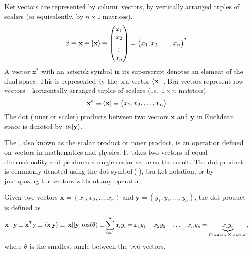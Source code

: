 \begin{defn}{1}
	Ket vectors are represented by column vectors, by vertically arranged tuples of scalers (or equivalently, by $n \times 1$ matrices).
	\begin{align}
		\vec{x} \equiv \mathbf{x} \equiv \ket{\mathbf{x}} \equiv \left(\begin{matrix}
			x_1 \\ x_2 \\ \vdots \\ x_n
		\end{matrix}\right) = \left(\begin{matrix}
		x_1, x_2, \hdots, x_n
	\end{matrix}\right)^T
	\end{align}
	A vector $\mathbf{x}^*$ with an asterisk symbol in its superscript denotes an element of the dual space. This is represented by the bra vector $\bra{\mathbf{x}}$ . Bra vectors represent row vectors - horizontally arranged tuples of scalars (i.e. $1 \times n$ matrices).
		\begin{align}
		\mathbf{x}^* \equiv \bra{\mathbf{x}} \equiv \left(\begin{matrix}
			x_1, x_2, \hdots, x_n
		\end{matrix}\right)
	\end{align}
	The dot (inner or scaler) products between two vectors $\mathbf{x}$ and $\mathbf{y}$ in Euclidean space is denoted by $\braket{\mathbf{x}|\mathbf{y}}$.
\end{defn}

The , also known as the scalar product or inner product, is an operation defined on vectors in mathematics and physics. It takes two vectors of equal dimensionality and produces a single scalar value as the result. The dot product is commonly denoted using the dot symbol ($\cdot$), bra-ket notation, or by juxtaposing the vectors without any operator.

\begin{defn}{1}
	Given two vectors $\mathbf{x}=(x_1, x_2, \hdots, x_n)$ and $\mathbf{y}=(y_1, y_2, \hdots, y_n)$, the dot product is defined as
	\begin{align}
		\mathbf{x}\cdot\mathbf{y} \equiv \mathbf{x}^T\mathbf{y} \equiv \braket{\mathbf{x}|\mathbf{y}} \equiv |\mathbf{x}||\mathbf{y}|\cos(\theta) \equiv \sum_{i=1}^{n} x_iy_i = x_1y_1 + x_2y_2 + \hdots + x_ny_n = \underbrace{x_iy_i}_{\text{Einstein Notation}},
	\end{align}
	where $\theta$ is the smallest angle between the two vectors.
\end{defn}


